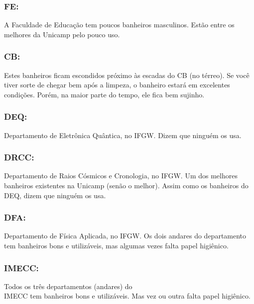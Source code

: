 \subsubsection{FE:} A Faculdade de Educação tem poucos banheiros masculinos.
Estão entre os melhores da Unicamp pelo pouco uso.

\subsubsection{CB:} Estes banheiros ficam escondidos próximo às escadas do CB
(no térreo). Se você tiver sorte de chegar bem após a limpeza, o banheiro
estará em excelentes condições. Porém, na maior parte do tempo, ele fica bem
sujinho.

\subsubsection{DEQ:} Departamento de Eletrônica Quântica, no IFGW. Dizem que
ninguém os usa.

\subsubsection{DRCC:} Departamento de Raios Cósmicos e Cronologia, no IFGW. Um
dos melhores banheiros existentes na Unicamp (senão o melhor). Assim como os
banheiros do DEQ, dizem que ninguém os usa.

\subsubsection{DFA:} Departamento de Física Aplicada, no IFGW. Os dois andares
do departamento tem banheiros bons e utilizáveis, mas algumas vezes falta
papel higiênico.

\subsubsection{IMECC:} Todos os três departamentos (andares) do\\IMECC tem
banheiros bons e utilizáveis. Mas vez ou outra falta papel higiênico.
